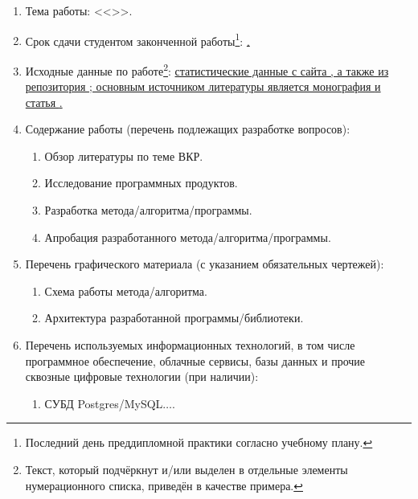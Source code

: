 \begin{enumerate}[1.]
	\item Тема работы: {\expandafter \ulined <<\thesisTitle>>.}
	\item Срок сдачи студентом законченной работы\footnote{Последний день преддипломной практики согласно учебному плану.}: \uline{\thesisDeadline.} 
	\item Исходные данные по работе\footnote{Текст, который подчёркнут и/или выделен в отдельные элементы нумерационного списка, приведён в качестве примера.}: \uline{статистические данные с сайта \cite{gosstat}, а также из репозитория \cite{uci}; основным источником литературы является монография \cite{Book} и статья \cite{Article}.}%
	\printbibliographyTask %
	\item Содержание работы (перечень подлежащих разработке вопросов):
	\begin{enumerate}[label=\theenumi\arabic*.]
		\item Обзор литературы по теме ВКР.%
		\item Исследование программных продуктов.%
		\item Разработка метода/алгоритма/программы.%
		\item Апробация разработанного метода/алгоритма/программы.%
	\end{enumerate}
	\item Перечень графического материала (с указанием обязательных чертежей): 
	\begin{enumerate}[label=\theenumi\arabic*.]
		\item Схема работы метода/алгоритма.%
		\item Архитектура разработанной программы/библиотеки.%
	\end{enumerate}	
		\item Перечень используемых информационных технологий, в том числе программное обеспечение, облачные сервисы, базы данных и прочие сквозные цифровые технологии (при наличии):
		\begin{enumerate}[label=\theenumi\arabic*.]
			\item СУБД Postgres/MySQL$\ldots$.%

\end{enumerate}
\end{enumerate}
